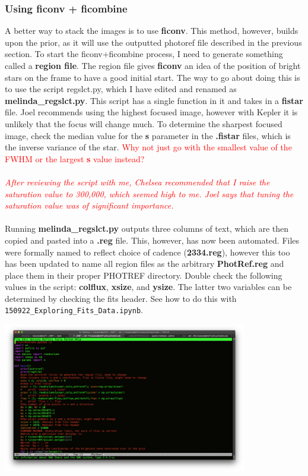 \documentclass[11pt,letterpaper]{book} %
\begin{document}
\subsubsection*{Using \textbf{ficonv} + \textbf{ficombine}}
A better way to stack the images is to use \textbf{ficonv}. This method, however, builds upon the prior, as it will use the outputted photoref file described in the previous section. 
To start the ficonv+ficombine process, I need to generate something called a \textbf{region file}. The region file gives \textbf{ficonv} an idea of the position of bright stars on the frame to have a good initial start.
The way to go about doing this is to use the script regslct.py, which I have edited and renamed as \textbf{melinda\_regslct.py}.
This script has a single function in it and takes in a \textbf{fistar} file. Joel recommends using the highest focused image, however with Kepler it is unlikely that the focus will change much. To determine the sharpest focused image, check the median value for the \textbf{s} parameter in the \textbf{.fistar} files, which is the inverse variance of the star.
\textcolor{red}{Why not just go with the smallest value of the FWHM or the largest \textbf{s} value instead?}\\ \\ 
\textcolor{red}{\textit{After reviewing the script with me, Chelsea recommended that I raise the saturation value to 300,000, which seemed high to me. Joel says that tuning the saturation value was of significant importance.}}\\ \\ 
Running \textbf{melinda\_regslct.py} outputs three columns of text, which are then copied and pasted into a \textbf{.reg} file. This, however, has now been automated.
Files were formally named to reflect choice of cadence (\textbf{2334.reg}), however this too has been updated to name all region files as the arbitrary \textbf{PhotRef.reg} and place them in their proper PHOTREF directory. 
Double check the following values in the script: \textbf{colflux},  \textbf{xsize}, and \textbf{ysize}.
The latter two variables can be determined by checking the fits header. See how to do this with \texttt{150922\_Exploring\_Fits\_Data.ipynb}.
\begin{center}
\includegraphics[width=0.8\textwidth]{regslct.png}
\end{center}
\end{document}
